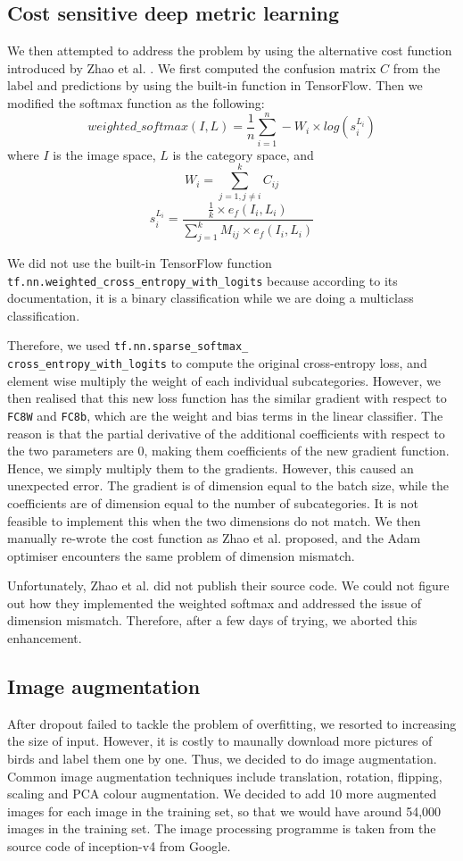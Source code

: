 \documentclass[letterpaper, 12pt]{article}
\begin{document}
\subsection{Cost sensitive deep metric learning}
We then attempted to address the problem by using the alternative cost function introduced by Zhao et al. \cite{Zhao}.
We first computed the confusion matrix $C$ from the label and predictions by using the built-in function in TensorFlow. Then we modified
the softmax function as the following:
$$weighted\_softmax(I,L)=\frac{1}{n}\sum^n_{i=1}-W_i\times log(s_i^{L_i})$$
where $I$ is the image space, $L$ is the category space, and
$$W_i=\sum^k_{j=1,j\not =i}C_{ij}$$
$$s_i^{L_i}=\frac{\frac{1}{k}\times e_f(I_i,L_i)}{\sum^k_{j=1}M_{ij}\times e_f(I_i,L_i)}$$

We did not use the built-in TensorFlow function \texttt{tf.nn.weighted\_cross\_entropy\_with\_logits} because according to its documentation, it
is a binary classification while we are doing a multiclass classification.

Therefore, we used \texttt{tf.nn.sparse\_softmax\_\\cross\_entropy\_with\_logits} to compute the original cross-entropy loss, and element wise multiply the
weight of each individual subcategories. However, we then realised that this new loss function has the similar gradient with respect to \texttt{FC8W} and
\texttt{FC8b}, which are the weight and bias terms in the linear classifier. The reason is that the partial derivative of the additional coefficients with
respect to the two parameters are 0, making them coefficients of the new gradient function. Hence, we simply multiply them to the gradients. However, this
caused an unexpected error. The gradient is of dimension equal to the batch size, while the coefficients are of dimension equal to the number of subcategories.
It is not feasible to implement this when the two dimensions do not match. We then manually re-wrote the cost function as Zhao et al. \cite{Zhao} proposed,
and the Adam optimiser encounters the same problem of dimension mismatch.

Unfortunately, Zhao et al. \cite{Zhao} did not publish their source code. We could not figure out how they implemented the weighted softmax and addressed the
issue of dimension mismatch. Therefore, after a few days of trying, we aborted this enhancement.

\subsection{Image augmentation}
After dropout failed to tackle the problem of overfitting, we resorted to increasing the size of input. However, it is costly to maunally download more pictures
of birds and label them one by one. Thus, we decided to do image augmentation. Common image augmentation techniques include translation, rotation, flipping, scaling
and PCA colour augmentation. We decided to add 10 more augmented images for each image in the training set, so that we would have around 54,000 images in the
training set. The image processing programme is taken from the source code of inception-v4 from Google.
\end{document}
